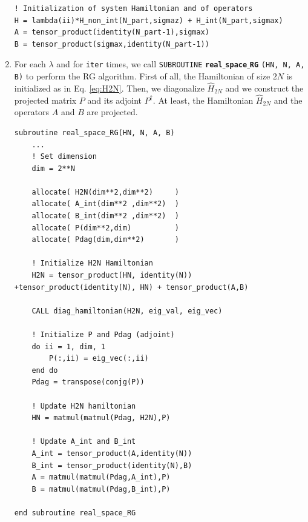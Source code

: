 \documentclass[rmp,10pt,onecolumn,fleqn,notitlepage]{revtex4-1}
\begin{document}
\begin{enumerate}
\begin{minipage}[t]{0.65\linewidth}%
\begin{lstlisting}[style=Fortran]
! Initialization of system Hamiltonian and of operators
H = lambda(ii)*H_non_int(N_part,sigmaz) + H_int(N_part,sigmax)
A = tensor_product(identity(N_part-1),sigmax)
B = tensor_product(sigmax,identity(N_part-1))\end{lstlisting}
\end{minipage}

\item For each \( \lambda  \) and for \texttt{iter} times, we call \texttt{SUBROUTINE} {\bfseries\texttt{real$\_$space$\_$RG}} \texttt{(HN, N, A, B)} to perform the RG algorithm. First of all, the Hamiltonian of size \( 2N \) is initialized as in Eq. \eqref{eq:H2N}. Then, we diagonalize \( \hat{H} _{2N} \) and we construct the projected matrix \( P \) and its adjoint \( P ^\dag  \). At least, the Hamiltonian \( \hat{H}_{2N}  \) and the operators \( A \) and \( B \) are projected.

\begin{minipage}[t]{0.97\linewidth}%
\begin{lstlisting}[style=Fortran]
subroutine real_space_RG(HN, N, A, B)
    ...
    ! Set dimension
    dim = 2**N

    allocate( H2N(dim**2,dim**2)     )
    allocate( A_int(dim**2 ,dim**2)  )
    allocate( B_int(dim**2 ,dim**2)  )
    allocate( P(dim**2,dim)          )
    allocate( Pdag(dim,dim**2)       )

    ! Initialize H2N Hamiltonian
    H2N = tensor_product(HN, identity(N)) +tensor_product(identity(N), HN) + tensor_product(A,B)

    CALL diag_hamiltonian(H2N, eig_val, eig_vec)

    ! Initialize P and Pdag (adjoint)
    do ii = 1, dim, 1
        P(:,ii) = eig_vec(:,ii)
    end do
    Pdag = transpose(conjg(P))

    ! Update H2N hamiltonian
    HN = matmul(matmul(Pdag, H2N),P)

    ! Update A_int and B_int
    A_int = tensor_product(A,identity(N))
    B_int = tensor_product(identity(N),B)
    A = matmul(matmul(Pdag,A_int),P)
    B = matmul(matmul(Pdag,B_int),P)

end subroutine real_space_RG\end{lstlisting}
\end{minipage}


\end{enumerate}
\end{document}
